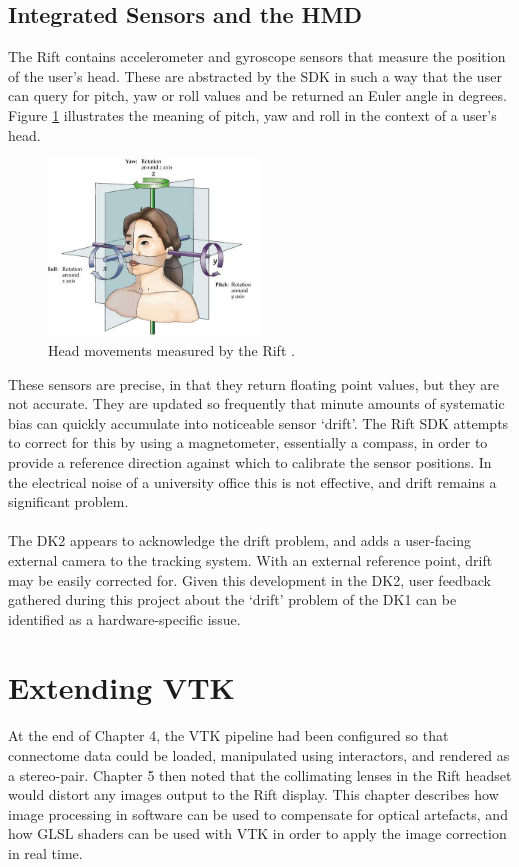 \documentclass[MSc,paper=a4,pagesize=auto]{icldt}
\begin{document}
\section{Integrated Sensors and the HMD}
The Rift contains accelerometer and gyroscope sensors that measure the position of the user's head. These are abstracted by the SDK in such a way that the user can query for pitch, yaw or roll values and be returned an Euler angle in degrees. Figure \ref{fig:pitch_yaw_roll} illustrates the meaning of pitch, yaw and roll in the context of a user's head.

\begin{figure}[htbp!]
    \centering
    \includegraphics[width=0.5\textwidth]{resources/pitch_yaw_roll}
    \caption{Head movements measured by the Rift \cite{Thompson2001}.}
    \label{fig:pitch_yaw_roll}
\end{figure}

These sensors are precise, in that they return floating point values, but they are not accurate. They are updated so frequently that minute amounts of systematic bias can quickly accumulate into noticeable sensor `drift'. The Rift SDK attempts to correct for this by using a magnetometer, essentially a compass, in order to provide a reference direction against which to calibrate the sensor positions. In the electrical noise of a university office this is not effective, and drift remains a significant problem. 
\\
\\
The DK2 appears to acknowledge the drift problem, and adds a user-facing external camera to the tracking system. With an external reference point, drift may be easily corrected for. Given this development in the DK2, user feedback gathered during this project about the `drift' problem of the DK1 can be identified as a hardware-specific issue.

\chapter{Extending VTK}
At the end of Chapter 4, the VTK pipeline had been configured so that connectome data could be loaded, manipulated using interactors, and rendered as a stereo-pair. Chapter 5 then noted that the collimating lenses in the Rift headset would distort any images output to the Rift display. This chapter describes how image processing in software can be used to compensate for optical artefacts, and how GLSL shaders can be used with VTK in order to apply the image correction in real time. 
\end{document}
